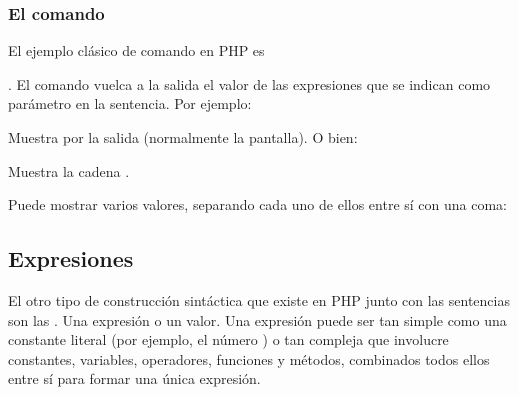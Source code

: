 \documentclass[a4paper,12pt,spanish]{sphinxmanual}
\begin{document}
\ignorespaces 

\subsubsection{El comando }
\label{\detokenize{php:index-6}}\label{\detokenize{php:el-comando-echo}}
El ejemplo clásico de comando en PHP es %
\begin{footnote}[1]\sphinxAtStartFootnote
{}
%
\end{footnote}. El comando   vuelca a
la salida el valor de las expresiones que se indican como parámetro en la
sentencia. Por ejemplo:

\begin{sphinxVerbatim}[commandchars=\\\{\}]
   
\end{sphinxVerbatim}

Muestra  por la salida (normalmente la pantalla). O bien:

\begin{sphinxVerbatim}[commandchars=\\\{\}]
 
\end{sphinxVerbatim}

Muestra la cadena .

Puede mostrar varios valores, separando cada uno de ellos entre sí con una
coma:

\begin{sphinxVerbatim}[commandchars=\\\{\}]
    
\end{sphinxVerbatim}

\ignorespaces 

\subsection{Expresiones}
\label{\detokenize{php:expresiones}}\label{\detokenize{php:index-7}}
El otro tipo de construcción sintáctica que existe en PHP junto con las
sentencias son las . Una expresión  o  un
valor. Una expresión puede ser tan simple como una constante literal (por
ejemplo, el número ) o tan compleja que involucre constantes, variables,
operadores, funciones y métodos, combinados todos ellos entre sí para formar una
única expresión.
\end{document}
